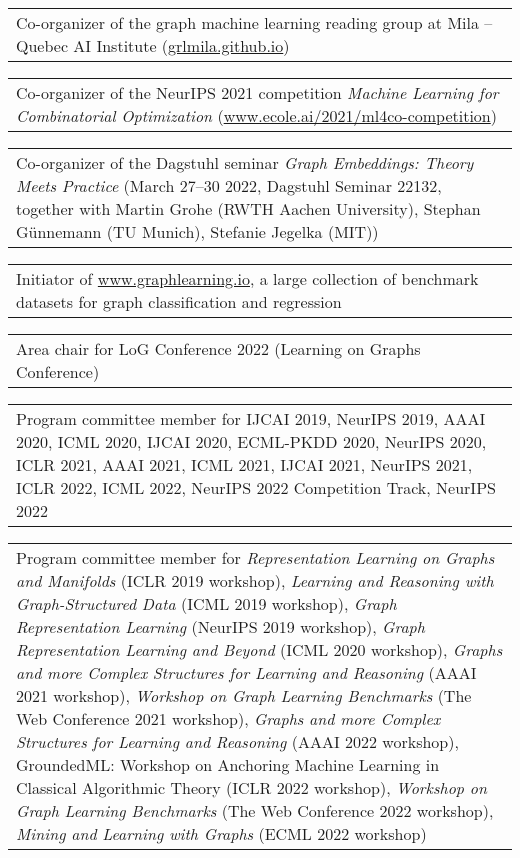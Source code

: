 \documentclass[11pt, a4paper, DIV=12]{scrartcl}
\begin{document}
\begin{tabular}{p{14.5cm}}
	Co-organizer of the graph machine learning reading group at Mila -- Quebec AI Institute (\url{grlmila.github.io}) \\[0.5em]	
\end{tabular}

\begin{tabular}{p{14.5cm}}
Co-organizer of the NeurIPS 2021 competition \emph{Machine Learning for Combinatorial Optimization} (\url{www.ecole.ai/2021/ml4co-competition}) \\[0.5em]	
\end{tabular}

\begin{tabular}{p{14.5cm}}
Co-organizer of the Dagstuhl seminar \emph{Graph Embeddings: Theory Meets Practice} (March 27–30 2022, Dagstuhl Seminar 22132, together with Martin Grohe (RWTH Aachen University), Stephan Günnemann (TU Munich), Stefanie Jegelka (MIT)) \\[0.5em]
\end{tabular}

\begin{tabular}{p{14.5cm}}
Initiator of \url{www.graphlearning.io}, a large collection of benchmark datasets for graph classification and regression\\[0.5em]
\end{tabular}

\begin{tabular}{p{14.5cm}}	
Area chair for LoG Conference 2022 (Learning on Graphs Conference) 
  \\[0.5em]
\end{tabular}


\begin{tabular}{p{14.5cm}}	
Program committee member for IJCAI 2019, NeurIPS  2019, AAAI 2020, ICML 2020, IJCAI 2020, ECML-PKDD 2020, NeurIPS 2020, ICLR 2021, AAAI 2021, ICML 2021, IJCAI 2021, NeurIPS 2021, ICLR 2022, ICML 2022, NeurIPS 2022 Competition Track, NeurIPS 2022 \\[0.5em]
\end{tabular}

\begin{tabular}{p{14.5cm}}
Program committee member for \emph{Representation Learning on Graphs and Manifolds} (ICLR 2019 workshop), \emph{Learning and Reasoning with Graph-Structured Data} (ICML 2019 workshop), \emph{Graph Representation Learning} (NeurIPS 2019 workshop), \emph{Graph Representation Learning and Beyond} (ICML 2020 workshop), \emph{Graphs and more Complex Structures for Learning and Reasoning} (AAAI 2021 workshop), \emph{Workshop on Graph Learning Benchmarks} (The Web Conference 2021 workshop),  \emph{Graphs and more Complex Structures for Learning and Reasoning} (AAAI 2022 workshop), GroundedML: Workshop on Anchoring Machine Learning in Classical Algorithmic Theory (ICLR 2022 workshop), \emph{Workshop on Graph Learning Benchmarks} (The Web Conference 2022 workshop), \emph{Mining and
Learning with Graphs} (ECML 2022 workshop)\\[0.5em]
\end{tabular}
\end{document}
